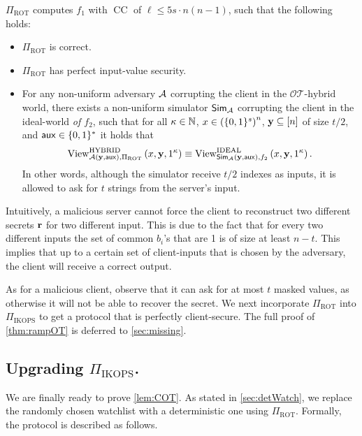 \documentclass{llncs}
\newcommand{\OTfunc}{\mathcal{OT}}
\newcommand{\OThybrid}{\OTfunc\mbox{-}\text{hybrid}}
\newcommand{\sOT}[3]{\binom{#2}{#1}\text{-}#3\text{-string-OT}}
\newcommand{\rampOT}{\operatorname{ROT}}
\newcommand{\ROT}{\operatorname{ROT}}
\newcommand{\y}{\myvec{y}}
\newcommand{\aux}{\mathsf{aux}}
\newcommand{\HYBRID}{\operatorname{HYBRID}}
\newcommand{\IDEAL}{\operatorname{IDEAL}}
\newcommand{\View}{\operatorname{View}}
\newcommand{\CC}{\operatorname{CC}}
\newcommand{\IKOPS}{\operatorname{IKOPS}}
\begin{document}
\begin{lemma}\label{thm:rampOT}%
	$\Pi_{\rampOT}$ computes $f_1$ with $\CC$ of $\ell\leq 5s\cdot n(n-1)$, such that the following holds:
	\begin{itemize}
	\item $\Pi_{\rampOT}$ is correct.
	\item $\Pi_{\rampOT}$ has perfect input-value security.
	\item For any non-uniform adversary $\mathcal{A}$ corrupting the client in the $\OThybrid$ world, there exists a non-uniform simulator $\mathsf{Sim}_{\mathcal{A}}$ corrupting the client in the ideal-world \emph{of $f_2$}, such that for all $\kappa\in{\mathbb{N}}$, $x\in\left(\{0,1\}^s\right)^n$, $\y\su[n]$ of size $t/2$, and $\aux\in\zo^*$ it holds that
    $$\View^{\HYBRID}_{\adv\of{\y,\aux},\Pi_{\rampOT}}\of{x,\y,1^{\kappa}} \equiv\View^{\IDEAL}_{\Sim_{\adv}\of{\y,\aux},f_2}\of{x,\y,1^{\kappa}}.$$
	In other words, although the simulator receive $t/2$ indexes as inputs, it is allowed to ask for $t$ strings from the server's input.
	 \end{itemize} 
\end{lemma}

Intuitively, a malicious server cannot force the client to reconstruct two different secrets ${\bf r}$ for two different input. This is due to the fact that for every two different inputs the set of common $b_i$'s that are 1 is of size at least $n-t$. This implies that up to a certain set of client-inputs that is chosen by the adversary, the client will receive  a correct output.

As for a malicious client, observe that it can ask for at most $t$ masked values, as otherwise it will not be able to recover the secret. We next incorporate $\Pi_{\ROT}$ into $\Pi_{\IKOPS}$ to get a protocol that is perfectly client-secure. The full proof of \cref{thm:rampOT} is deferred to \cref{sec:missing}.

\subsection{Upgrading $\Pi_{\IKOPS}$.}\label{sec:up-ikops}
We are finally ready to prove \cref{lem:COT}. As stated in \cref{sec:detWatch}, we replace the randomly chosen watchlist with a deterministic one using $\Pi_{\ROT}$. Formally, the protocol is described as follows.
\end{document}
